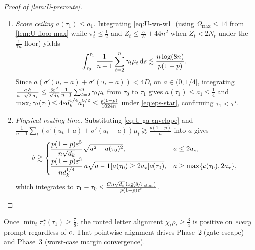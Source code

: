 \begin{proof}[Proof of \cref{lem:U-preroute}]
\begin{enumerate}[label=(\alph*),leftmargin=*]
\item \emph{Score ceiling $a(\tau_1) \le a_1$.} Integrating \cref{eq:U-wn-w1} (using $\Omega_{\max} \le 14$ from \cref{lem:U-floor-max} while $\pi_t^\star \le \frac{1}{2}$ and $Z_t \le \frac{5}{W} + 44n^2$ when $Z_t < 2N_t$ under the $\frac{1}{7n}$ floor) yields
\[
  \int_{\tau_0}^{\tau_1}\frac{1}{n-1}\sum_{t=2}^n \gamma_t\mu_t\,\mathrm{d} s \lesssim \frac{n\log(8n)}{p(1-p)}.
\]
Since $a(\sigma'(u_t+a)+\sigma'(u_t-a)) < 4 D_t$ on $a \in (0, 1/4]$, integrating $\frac{a\,\dot a}{a + \sqrt 2\,a_\star} \le \frac{6\varepsilon^2}{\sqrt{d_k}}\frac{1}{n-1}\sum_{t=2}^n \gamma_t\mu_t$ from $\tau_0$ to $\tau_1$ gives $a(\tau_1) \le a_1 \le \frac{1}{4}$ and $\max_t\gamma_t(\tau_1) \le 4\varepsilon d_k^{1/4}a_1^{3/2} \le \frac{p(1-p)}{1024n}$ under \cref{eq:eps-star}, confirming $\tau_1 < \tau^\star$.

\item \emph{Physical routing time.} Substituting \cref{eq:U-ga-envelope} and $\frac{1}{n-1}\sum_t(\sigma'(u_t+a)+\sigma'(u_t-a))\mu_t \gtrsim \frac{p(1-p)}{n}$ into $\dot a$ gives
\[
  \dot a \gtrsim \begin{cases}
    \dfrac{p(1-p)\varepsilon^5}{n\sqrt{d_k}}\sqrt{a^2 - a(\tau_0)^2}, & a \le 2a_\star,\\[6pt]
    \dfrac{p(1-p)\varepsilon^3}{n d_k^{1/4}}\,a\sqrt{a - \mathbf 1[a(\tau_0)\ge 2a_\star]a(\tau_0)}, & a \ge \max\{a(\tau_0), 2a_\star\},
  \end{cases}
\]
which integrates to $\tau_1 - \tau_0 \le \frac{C n\sqrt{d_k}\log(8/r_{\mathrm{align}})}{p(1-p)\varepsilon^5}$.\qedhere
\end{enumerate}
\end{proof}

Once $\min_t\pi_t^\star(\tau_1) \ge \frac{7}{8}$, the routed letter alignment $\chi_t\rho_t \ge \frac{3}{4}$ is positive on \emph{every} prompt regardless of $c$. That pointwise alignment drives Phase~2 (gate escape) and Phase~3 (worst-case margin convergence).

